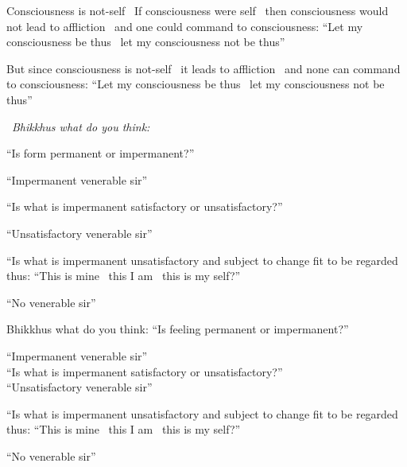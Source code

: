 \begin{english-only-hang}
  Consciousness is not-self \breathmark\ If consciousness were self \breathmark\ then consciousness would not lead to affliction \breathmark\ and one could command to consciousness: ``Let my consciousness be thus \breathmark\ let my consciousness not be thus''
\end{english-only-hang}
\begin{english-only-hang-together}
  But since consciousness is not-self \breathmark\ it leads to affliction \breathmark\ and none can command to consciousness: ``Let my consciousness be thus \breathmark\ let my consciousness not be thus''
\end{english-only-hang-together}

\begin{english-only-leader}
  \anglebracketleft\ \hspace{-0.5mm}\textit{Bhikkhus what do you think:} \hspace{-0.5mm}\anglebracketright\
\end{english-only-leader}
\begin{english-only-hang-together}
  ``Is form permanent or impermanent?''
\end{english-only-hang-together}
\begin{english-only-hang-together}
  ``Impermanent venerable sir''
\end{english-only-hang-together}
\begin{english-only-hang-together}
  ``Is what is impermanent satisfactory or unsatisfactory?''
\end{english-only-hang-together}
\begin{english-only-hang-together}
  ``Unsatisfactory venerable sir''
\end{english-only-hang-together}
\begin{english-only-hang-together}
  ``Is what is impermanent unsatisfactory and subject to change fit to be regarded thus: ``This is mine \breathmark\ this I am \breathmark\ this is my self?''
\end{english-only-hang-together}
\begin{english-only-hang-together}
  ``No venerable sir''
\end{english-only-hang-together}

\begin{english-only-no-hang}
  \begin{english-only-hang}
    Bhikkhus what do you think: ``Is feeling permanent or impermanent?''
  \end{english-only-hang}
  ``Impermanent venerable sir''\\
  ``Is what is impermanent satisfactory or unsatisfactory?''\\
  ``Unsatisfactory venerable sir''\\
  \begin{english-hang-together}
    ``Is what is impermanent unsatisfactory and subject to change fit to be regarded thus: ``This is mine \breathmark\ this I am \breathmark\ this is my self?''
  \end{english-hang-together}
  ``No venerable sir''
\end{english-only-no-hang}

